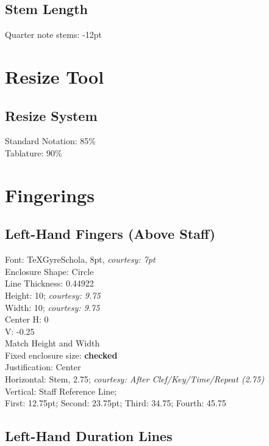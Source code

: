 \documentclass[unicode,hyperfootnotes=false,xetex,colorlinks=true,nofonts,nobib]{tufte-book} %
\begin{document}
\section{Stem Length}
\label{sec:stem-length}

Quarter note stems: -12pt

\chapter{Resize Tool}
\label{sec:resize-tool}

\section{Resize System}
\label{sec:resize-system}

Standard Notation: 85\%\\

\noindent Tablature: 90\%

\chapter{Fingerings}
\label{sec:fingerings}

\section{Left-Hand Fingers (Above Staff)}
\label{sec:left-hand-fingers}

Font: TeXGyreSchola, 8pt, \emph{courtesy: 7pt}\\
Enclosure Shape: Circle\\
Line Thickness: 0.44922\\
Height: 10; \emph{courtesy: 9.75}\\
Width: 10; \emph{courtesy: 9.75}\\
Center H: 0\\
V: -0.25\\
Match Height and Width\\
Fixed enclosure size: \textbf{checked}\\
Justification: Center\\
Horizontal: Stem, 2.75; \emph{courtesy: After Clef/Key/Time/Repeat (2.75)}\\
Vertical: Staff Reference Line;\\
First: 12.75pt; Second: 23.75pt; Third: 34.75; Fourth: 45.75

\section{Left-Hand Duration Lines}
\label{sec:left-hand-duration}
\end{document}
